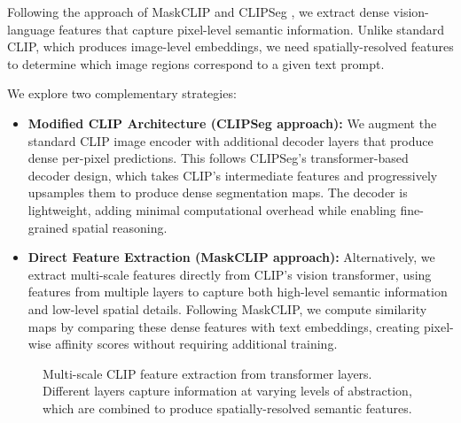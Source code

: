 Following the approach of MaskCLIP \cite{zhou2022extract} and CLIPSeg \cite{luddecke2022clipseg}, we extract dense vision-language features that capture pixel-level semantic information. Unlike standard CLIP, which produces image-level embeddings, we need spatially-resolved features to determine which image regions correspond to a given text prompt.

We explore two complementary strategies:

\begin{itemize}
    \item \textbf{Modified CLIP Architecture (CLIPSeg approach):} We augment the standard CLIP image encoder with additional decoder layers that produce dense per-pixel predictions. This follows CLIPSeg's transformer-based decoder design, which takes CLIP's intermediate features and progressively upsamples them to produce dense segmentation maps. The decoder is lightweight, adding minimal computational overhead while enabling fine-grained spatial reasoning.

    \item \textbf{Direct Feature Extraction (MaskCLIP approach):} Alternatively, we extract multi-scale features directly from CLIP's vision transformer, using features from multiple layers to capture both high-level semantic information and low-level spatial details. Following MaskCLIP, we compute similarity maps by comparing these dense features with text embeddings, creating pixel-wise affinity scores without requiring additional training.
\end{itemize}

\begin{figure}[h]
\centering
{}
\caption{Multi-scale CLIP feature extraction from transformer layers. Different layers capture information at varying levels of abstraction, which are combined to produce spatially-resolved semantic features.}
\label{fig:multiscale_features}
\end{figure}

